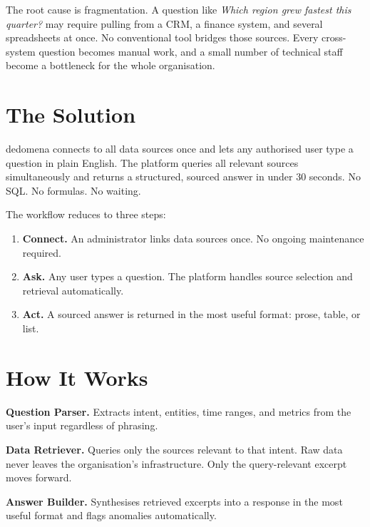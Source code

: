 \documentclass[12pt, a4paper]{article}
\begin{document}
The root cause is fragmentation. A question like \textit{Which region grew fastest
this quarter?} may require pulling from a CRM, a finance system, and several
spreadsheets at once. No conventional tool bridges those sources. Every cross-system
question becomes manual work, and a small number of technical staff become a
bottleneck for the whole organisation.

\section*{The Solution}

dedomena connects to all data sources once and lets any authorised user type a
question in plain English. The platform queries all relevant sources simultaneously
and returns a structured, sourced answer in under 30 seconds. No SQL. No formulas.
No waiting.

The workflow reduces to three steps:

\begin{enumerate}
  \item \textbf{Connect.} An administrator links data sources once. No ongoing
        maintenance required.
  \item \textbf{Ask.} Any user types a question. The platform handles source
        selection and retrieval automatically.
  \item \textbf{Act.} A sourced answer is returned in the most useful format:
        prose, table, or list.
\end{enumerate}

\section*{How It Works}

\textbf{Question Parser.}
Extracts intent, entities, time ranges, and metrics from the user's input
regardless of phrasing.

\textbf{Data Retriever.}
Queries only the sources relevant to that intent. Raw data never leaves the
organisation's infrastructure. Only the query-relevant excerpt moves forward.

\textbf{Answer Builder.}
Synthesises retrieved excerpts into a response in the most useful format and
flags anomalies automatically.

\end{document}
